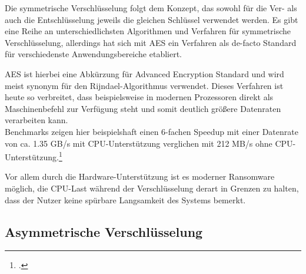 Die symmetrische Verschlüsselung folgt dem Konzept, das sowohl für die Ver- als auch die Entschlüsselung jeweils die gleichen Schlüssel verwendet werden.
Es gibt eine Reihe an unterschiedlichsten Algorithmen und Verfahren für symmetrische Verschlüsselung, allerdings hat sich mit \textsc{AES} ein Verfahren als de-facto Standard für verschiedenste Anwendungsbereiche etabliert.

AES ist hierbei eine Abkürzung für Advanced Encryption Standard und wird meist synonym für den Rijndael-Algorithmus verwendet. Dieses Verfahren ist heute so verbreitet, dass beispielsweise in modernen Prozessoren direkt als Maschinenbefehl zur Verfügung steht und somit deutlich größere Datenraten verarbeiten kann. \\
Benchmarks zeigen hier beispielshaft einen 6-fachen Speedup mit einer Datenrate von ca. 1.35 GB/s mit CPU-Unterstützung verglichen mit 212 MB/s ohne
CPU-Unterstützung.\footcite{aes:benchmark}

Vor allem durch die Hardware-Unterstützung ist es moderner Ransomware möglich, die CPU-Last während der Verschlüsselung derart in Grenzen zu halten, dass der Nutzer keine spürbare Langsamkeit des Systems bemerkt.


\subsection{Asymmetrische Verschlüsselung}
\label{sec:asym_verschl}

